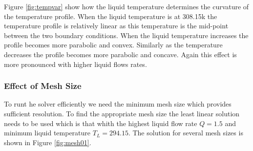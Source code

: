\documentclass[11pt]{article}
\begin{document}
Figure \ref{fig:tempvar} show how the liquid temperature determines the curvature of the temperature profile. When the liquid temperature is at 308.15k the temperature profile is relatively linear as this temperature is the mid-point between the two boundary conditions. When the liquid temperature increases the profile becomes more parabolic and convex. Similarly as the temperature decreases the profile becomes more parabolic and concave. Again this effect is more pronounced with higher liquid flows rates.

\clearpage

\subsubsection{Effect of Mesh Size}

To runt he solver efficiently we need the minimum mesh size which provides sufficient resolution. To find the appropriate mesh size the least linear solution needs to be used which is that whith the highest liquid flow rate $Q = 1.5$ and minimum liquid temperature $T_L = 294.15$. The solution for several mesh sizes is shown in Figure \ref{fig:mesh01}. 
\end{document}
